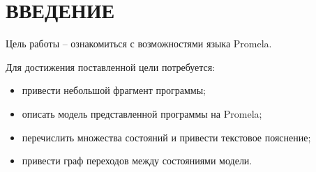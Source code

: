 \section*{ВВЕДЕНИЕ}

Цель работы -- ознакомиться с возможностями языка Promela.

Для достижения поставленной цели потребуется:
\begin{itemize}
	\item привести небольшой фрагмент программы;
	\item описать модель представленной программы на Promela;
	\item перечислить множества состояний и привести текстовое пояснение;
	\item привести граф переходов между состояниями модели.
\end{itemize}

\pagebreak